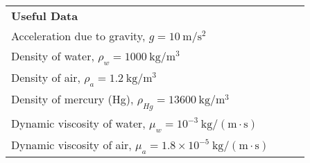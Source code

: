 \begin{center}
\begin{tabular}{|>{\centering\arraybackslash}m{0.9\linewidth}|}
\hline
\textbf{Useful Data} \\ 
Acceleration due to gravity, $g = 10 \ \mathrm{m/s^2}$ \\[4pt]
Density of water, $\rho_w = 1000 \ \mathrm{kg/m^3}$ \\[4pt]
Density of air, $\rho_a = 1.2 \ \mathrm{kg/m^3}$ \\[4pt]
Density of mercury (Hg), $\rho_{Hg} = 13600 \ \mathrm{kg/m^3}$ \\[4pt]
Dynamic viscosity of water, $\mu_w = 10^{-3} \ \mathrm{kg/(m \cdot s)}$ \\[4pt]
Dynamic viscosity of air, $\mu_a = 1.8 \times 10^{-5} \ \mathrm{kg/(m \cdot s)}$ \\ 
\hline
\end{tabular}
\end{center}